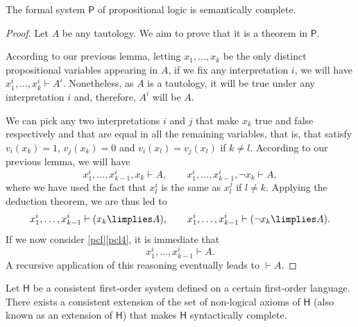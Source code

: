 \begin{theorem}
The formal system $\mathsf{P}$ of propositional logic is semantically complete.
\label{psemcom}
\end{theorem}

\begin{proof}
Let $A$ be any tautology. We aim to prove that it is a theorem in $\mathsf{P}$.

According to our previous lemma, letting $x_1,\ldots,x_k$ be the only distinct propositional variables appearing in $A$, if we fix any interpretation $i$, we will have $x_1^i,\ldots,x_k^i \vdash A^i$. Nonetheless, as $A$ is a tautology, it will be true under any interpretation $i$ and, therefore, $A^i$ will be $A$.

We can pick any two interpretations $i$ and $j$ that make $x_k$ true and false respectively and that are equal in all the remaining variables, that is, that satisfy $v_i(x_k) = 1$, $v_j(x_k) = 0$ and $v_i(x_l) = v_j(x_l)$ if $k \neq l$.
According to our previous lemma, we will have
\[ x_1^i,\ldots,x_{k-1}^i,x_k \vdash A,\qquad
x_1^i,\ldots,x_{k-1}^i, \lnot x_k \vdash A,\]
where we have used the fact that $x_l^i$ is the same as $x_l^j$ if $l \neq k$.
Applying the deduction theorem, we are thus led to
\[ x_1^i,\ldots,x_{k-1}^i \vdash (x_k \limplies A),\qquad
x_1^i,\ldots,x_{k-1}^i \vdash (\lnot x_k \limplies A).\]
If we now consider \ref{pcl}\ref{pcl4}, it is immediate that
\[ x_1^i,\ldots,x_{k-1}^i \vdash A.\]
A recursive application of this reasoning eventually leads to $\vdash A$.
\end{proof}


\begin{lemma}
Let $\mathsf{H}$ be a consistent first-order system defined on a certain first-order language.
There exists a consistent extension of the set of non-logical axioms of $\mathsf{H}$ (also known as an extension of $\mathsf{H}$) that makes $\mathsf{H}$ syntactically complete.
\label{fol-scext}
\end{lemma}

